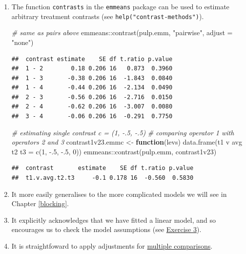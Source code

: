 \documentclass[
]{book}
\newenvironment{Shaded}{\begin{snugshade}}{\end{snugshade}}
\newcommand{\AttributeTok}[1]{\textcolor[rgb]{0.77,0.63,0.00}{#1}}
\newcommand{\CommentTok}[1]{\textcolor[rgb]{0.56,0.35,0.01}{\textit{#1}}}
\newcommand{\ControlFlowTok}[1]{\textcolor[rgb]{0.13,0.29,0.53}{\textbf{#1}}}
\newcommand{\DecValTok}[1]{\textcolor[rgb]{0.00,0.00,0.81}{#1}}
\newcommand{\FunctionTok}[1]{\textcolor[rgb]{0.00,0.00,0.00}{#1}}
\newcommand{\NormalTok}[1]{#1}
\newcommand{\OtherTok}[1]{\textcolor[rgb]{0.56,0.35,0.01}{#1}}
\newcommand{\SpecialCharTok}[1]{\textcolor[rgb]{0.00,0.00,0.00}{#1}}
\newcommand{\StringTok}[1]{\textcolor[rgb]{0.31,0.60,0.02}{#1}}
\theoremstyle{definition}
\theoremstyle{definition}
\theoremstyle{definition}
\theoremstyle{definition}
\theoremstyle{remark}
\begin{document}
\begin{enumerate}
\def\labelenumi{\alph{enumi}.}
\item
  The function \texttt{contrasts} in the \texttt{emmeans} package can be used to estimate arbitrary treatment contrasts (see \texttt{help("contrast-methods")}).

\begin{Shaded}
\begin{Highlighting}[]
\CommentTok{\# same as \textasciigrave{}pairs\textasciigrave{} above}
\NormalTok{emmeans}\SpecialCharTok{::}\FunctionTok{contrast}\NormalTok{(pulp.emm, }\StringTok{"pairwise"}\NormalTok{, }\AttributeTok{adjust =} \StringTok{"none"}\NormalTok{)}
\end{Highlighting}
\end{Shaded}

\begin{verbatim}
##  contrast estimate    SE df t.ratio p.value
##  1 - 2        0.18 0.206 16   0.873  0.3960
##  1 - 3       -0.38 0.206 16  -1.843  0.0840
##  1 - 4       -0.44 0.206 16  -2.134  0.0490
##  2 - 3       -0.56 0.206 16  -2.716  0.0150
##  2 - 4       -0.62 0.206 16  -3.007  0.0080
##  3 - 4       -0.06 0.206 16  -0.291  0.7750
\end{verbatim}

\begin{Shaded}
\begin{Highlighting}[]
\CommentTok{\# estimating single contrast c = (1, {-}.5, {-}.5)}
\CommentTok{\# comparing operator 1 with operators 2 and 3}
\NormalTok{contrast1v23.emmc }\OtherTok{\textless{}{-}} \ControlFlowTok{function}\NormalTok{(levs) }
  \FunctionTok{data.frame}\NormalTok{(}\StringTok{\textquotesingle{}t1 v avg t2 t3\textquotesingle{}} \OtherTok{=} \FunctionTok{c}\NormalTok{(}\DecValTok{1}\NormalTok{, }\SpecialCharTok{{-}}\NormalTok{.}\DecValTok{5}\NormalTok{, }\SpecialCharTok{{-}}\NormalTok{.}\DecValTok{5}\NormalTok{, }\DecValTok{0}\NormalTok{))}
\NormalTok{emmeans}\SpecialCharTok{::}\FunctionTok{contrast}\NormalTok{(pulp.emm, }\StringTok{\textquotesingle{}contrast1v23\textquotesingle{}}\NormalTok{)}
\end{Highlighting}
\end{Shaded}

\begin{verbatim}
##  contrast       estimate    SE df t.ratio p.value
##  t1.v.avg.t2.t3     -0.1 0.178 16  -0.560  0.5830
\end{verbatim}
\item
  It more easily generalises to the more complicated models we will see in Chapter \ref{blocking}.
\item
  It explicitly acknowledges that we have fitted a linear model, and so encourages us to check the model assumptions (see \protect\hyperlink{nap-black-ex}{Exercise 3}).
\item
  It is straightfoward to apply adjustments for \protect\hyperlink{multiple-comp}{multiple comparisons}.
\end{enumerate}
\end{document}
